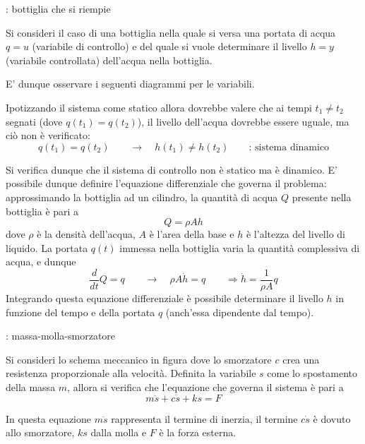  	\begin{esempio}{: bottiglia che si riempie} \label{es:01:bottiglia}
 		
 		Si consideri il caso di una bottiglia nella quale si versa una portata di acqua $q=u$ (variabile di controllo) e del quale si vuole determinare il livello $h=y$ (variabile controllata) dell'acqua nella bottiglia.
 		
 		E' dunque osservare i seguenti diagrammi per le variabili.
 		
 		
 		\begin{center}
 		\end{center}
 		
 		Ipotizzando il sistema come statico allora dovrebbe valere che ai tempi $t_1\neq t_2$ segnati (dove $q(t_1)=q(t_2)$), il livello dell'acqua dovrebbe essere uguale, ma ciò non è verificato:
 		\[ q(t_1 ) = q(t_2) \qquad \rightarrow \quad h(t_1) \neq h(t_2) \qquad \textrm{: sistema dinamico} \]
 		
 		Si verifica dunque che il sistema di controllo non è statico ma è dinamico. E' possibile dunque definire l'equazione differenziale che governa il problema: approssimando la bottiglia ad un cilindro, la quantità di acqua $Q$ presente nella bottiglia è pari a 
 		\[ Q = \rho  A h \]
 		dove $\rho$ è la densità dell'acqua, $A$ è l'area della base e $h$ è l'altezza del livello di liquido. La portata $q(t)$ immessa nella bottiglia varia la quantità complessiva di acqua, e dunque
 		\[ \frac{d}{dt} Q = q \qquad \rightarrow \quad \rho A \dot h = q\qquad \Rightarrow \dot h = \frac{1}{\rho A} q \]
 		Integrando questa equazione differenziale è possibile determinare il livello $h$ in funzione del tempo e della portata $q$ (anch'essa dipendente dal tempo).		
 		
 	\end{esempio} 
 	
 	\begin{esempio}{: massa-molla-smorzatore} \label{es:01:massamollasmorz}
 		\begin{center}
 		\end{center}
 		Si consideri lo schema meccanico in figura dove lo smorzatore $c$ crea una resistenza proporzionale alla velocità. Definita la variabile $s$ come lo spostamento della massa $m$, allora si verifica che l'equazione che governa il sistema è pari a 
 		\[ m\ddot s + c\dot s+ k s = F  \]
 		
 		In questa equazione $m\ddot s$ rappresenta il termine di inerzia, il termine $c\dot s$ è dovuto allo smorzatore, $ks$ dalla molla e $F$ è la forza esterna.
 	\end{esempio}
 	

